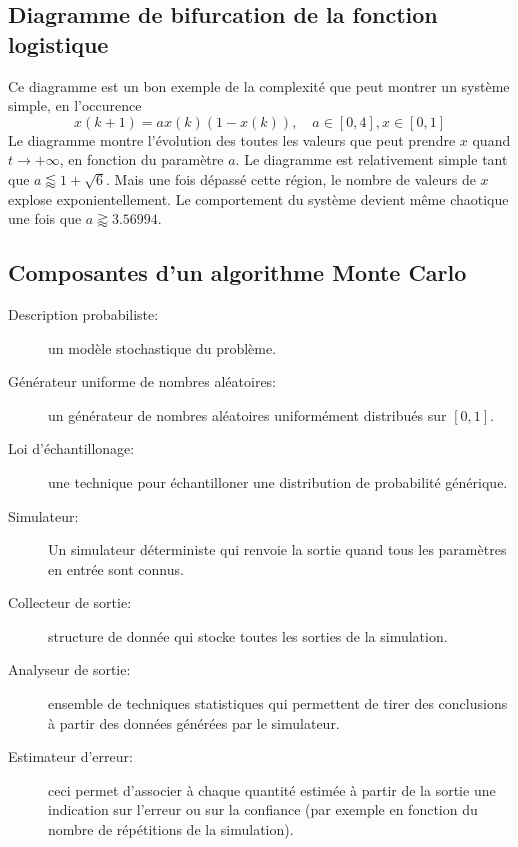 \documentclass[a4paper]{article}
\begin{document}
\subsection{Diagramme de bifurcation de la fonction logistique}
Ce diagramme est un bon exemple de la complexité que peut montrer un
système simple, en l'occurence
\[x(k+1)=ax(k)(1-x(k)),\quad a\in[0,4],x\in[0,1]\]
Le diagramme montre l'évolution des toutes les valeurs que peut prendre
\(x\) quand \(t\to + \infty \), en fonction du paramètre \(a\).
Le diagramme est relativement simple tant que \(a\lessapprox 1+\sqrt{6}\).
Mais une fois dépassé cette région, le nombre de valeurs de \(x\) explose
exponientellement. Le comportement du système devient même chaotique une
fois que \(a \gtrapprox 3.56994\).
\subsection{Composantes d'un algorithme Monte Carlo}
\begin{description}
	\item[Description probabiliste:] un modèle stochastique du problème.
	\item[Générateur uniforme de nombres aléatoires:]un générateur de
		nombres aléatoires uniformément distribués sur \([0,1]\).
	\item[Loi d'échantillonage:]une technique pour échantilloner une
		distribution de probabilité générique.
	\item[Simulateur:]Un simulateur déterministe qui renvoie la sortie
		quand tous les paramètres en entrée sont connus.
	\item[Collecteur de sortie:]structure de donnée qui stocke toutes
		les sorties de la simulation.
	\item[Analyseur de sortie:]ensemble de techniques statistiques qui
		permettent de tirer des conclusions à partir des données
		générées par le simulateur.
	\item[Estimateur d'erreur:]ceci permet d'associer à chaque quantité
		estimée à partir de la sortie une indication sur l'erreur ou sur
		la confiance (par exemple en fonction du nombre de répétitions
		de la simulation).
\end{description}
\end{document}

